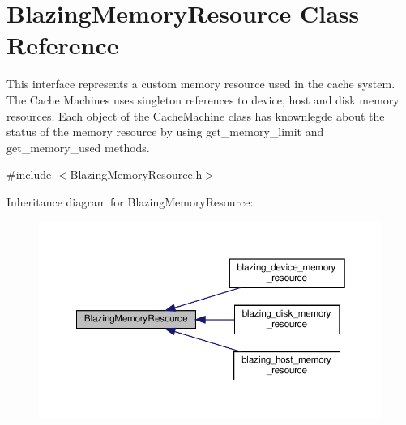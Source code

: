 \hypertarget{classBlazingMemoryResource}{}\section{Blazing\+Memory\+Resource Class Reference}
\label{classBlazingMemoryResource}


This interface represents a custom memory resource used in the cache system. The Cache Machines uses singleton references to device, host and disk memory resources. Each object of the Cache\+Machine class has knownlegde about the status of the memory resource by using {\ttfamily get\+\_\+memory\+\_\+limit} and {\ttfamily get\+\_\+memory\+\_\+used} methods.  




{\ttfamily \#include $<$Blazing\+Memory\+Resource.\+h$>$}



Inheritance diagram for Blazing\+Memory\+Resource\+:\nopagebreak
\begin{figure}[H]
\begin{center}
\leavevmode
\includegraphics[width=350pt]{classBlazingMemoryResource__inherit__graph}
\end{center}
\end{figure}
